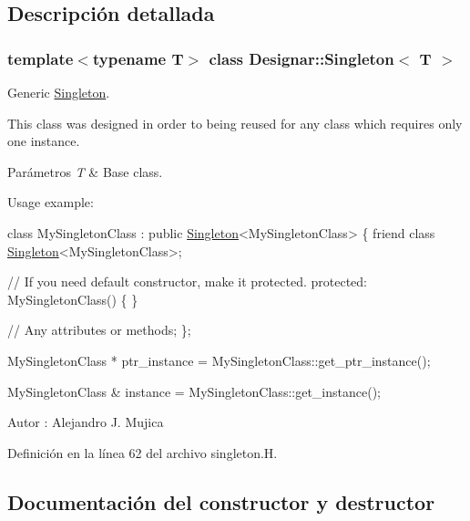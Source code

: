 \subsection{Descripción detallada}
\subsubsection*{template$<$typename T$>$\newline
class Designar\+::\+Singleton$<$ T $>$}

Generic \hyperlink{class_designar_1_1_singleton}{Singleton}.

This class was designed in order to being reused for any class which requires only one instance.


\begin{DoxyParams}{Parámetros}
{\em T} & Base class.\\
\hline
\end{DoxyParams}
Usage example\+:


\begin{DoxyCode}
\textcolor{keyword}{class }MySingletonClass : \textcolor{keyword}{public} \hyperlink{class_designar_1_1_singleton_ad2cc3d3b4ee614f4dd63bda386638f66}{Singleton}<MySingletonClass>
\{
  \textcolor{keyword}{friend} \textcolor{keyword}{class }\hyperlink{class_designar_1_1_singleton_ad2cc3d3b4ee614f4dd63bda386638f66}{Singleton}<MySingletonClass>;

  \textcolor{comment}{// If you need default constructor, make it protected.}
\textcolor{keyword}{protected}:
  MySingletonClass() \{ \}

  \textcolor{comment}{// Any attributes or methods;}
\};

MySingletonClass * ptr\_instance = MySingletonClass::get\_ptr\_instance();

MySingletonClass & instance = MySingletonClass::get\_instance();
\end{DoxyCode}


\begin{DoxyAuthor}{Autor}
\+: Alejandro J. Mujica 
\end{DoxyAuthor}


Definición en la línea 62 del archivo singleton.\+H.



\subsection{Documentación del constructor y destructor}
\mbox{\label{class_designar_1_1_singleton_ad2cc3d3b4ee614f4dd63bda386638f66}} 

